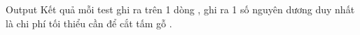 Output
Kết quả mỗi test ghi ra trên 1 dòng , ghi ra 1 số nguyên dương duy nhất là chi phí tối thiểu cần để cắt tấm gỗ .
